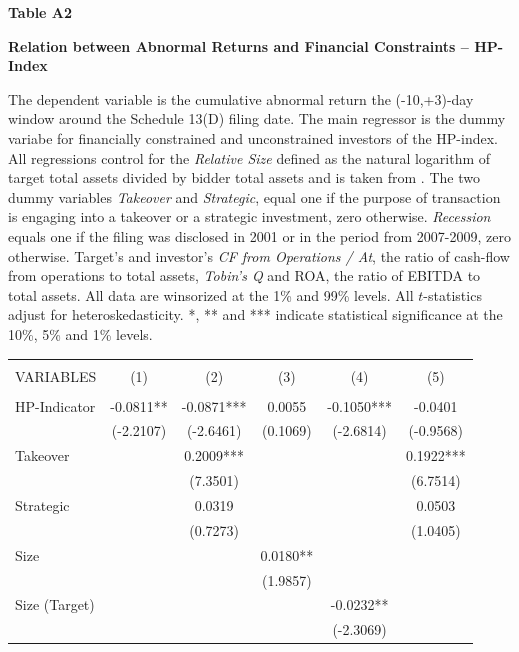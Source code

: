 \documentclass[12pt]{article}
\begin{document}
\begin{appendices}
\begin{table}[!htbp]
	\centering
	\textbf{Table A2}\par\medskip
	\large\textbf{Relation between Abnormal Returns and Financial Constraints -- HP-Index}\par\medskip
	\justifying
	\footnotesize\noindent{} The dependent variable is the cumulative abnormal return the (-10,+3)-day window around the Schedule 13(D) filing date. The main regressor is the dummy variabe for financially constrained and unconstrained investors of the HP-index. All regressions control for the \emph{Relative Size} defined as the natural logarithm of target total assets divided by bidder total assets and is taken from \citet[p.112]{Khatami2014}. The two dummy variables \emph{Takeover} and \emph{Strategic}, equal one if the purpose of transaction is engaging into a takeover or a strategic investment, zero otherwise. \emph{Recession} equals one if the filing was disclosed in 2001 or in the period from 2007-2009, zero otherwise. Target's and investor's \emph{CF from Operations / At}, the ratio of cash-flow from operations to total assets, \emph{Tobin's Q} and ROA, the ratio of EBITDA to total assets. All data are winsorized at the 1\% and 99\% levels. All $t$-statistics adjust for heteroskedasticity. *, ** and *** indicate statistical significance at the 10\%, 5\% and 1\% levels.\par\medskip
	\begin{adjustbox}{max width=\textwidth}
		\begin{tabular}{lccccc} \hline
			\\
		   VARIABLES & (1) & (2) & (3) & (4) & (5) \\ \hline
			&  &  &  &  &  \\
		   HP-Indicator& -0.0811** & -0.0871*** & 0.0055 & -0.1050*** & -0.0401 \\
			& (-2.2107) & (-2.6461) & (0.1069) & (-2.6814) & (-0.9568) \\
		   Takeover &  & 0.2009*** &  &  & 0.1922*** \\
			&  & (7.3501) &  &  & (6.7514) \\
		   Strategic &  & 0.0319 &  &  & 0.0503 \\
			&  & (0.7273) &  &  & (1.0405) \\
		   Size &  &  & 0.0180** &  &  \\
			&  &  & (1.9857) &  &  \\
		   Size (Target) &  &  &  & -0.0232** &  \\
			&  &  &  & (-2.3069) &  \\

\end{tabular}
\end{adjustbox}
\end{table}
\end{appendices}
\end{document}
